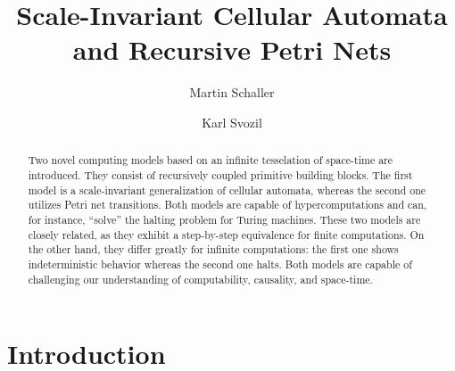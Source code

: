 \documentclass[pre,amssymb,showpacs,showkeys,preprint]{revtex4}
\begin{document}
\colourcoverpage


\title{Scale-Invariant Cellular Automata and Recursive Petri Nets}

\author{Martin Schaller}

\author{Karl Svozil}




\begin{abstract}
Two novel computing models based on an infinite tesselation of space-time are introduced. They consist of recursively coupled primitive building blocks. The first model is a scale-invariant generalization of cellular automata, whereas the second one utilizes Petri net transitions. Both models are capable of hypercomputations and can, for instance, ``solve'' the halting problem for Turing machines. These two models are closely related, as they exhibit a step-by-step equivalence for finite computations. On the other hand, they differ greatly for infinite computations: the first one shows indeterministic behavior whereas the second one halts. Both models are capable of challenging our understanding of computability, causality, and space-time.
\end{abstract}




\maketitle

\section{Introduction}
\end{document}
